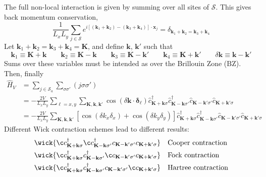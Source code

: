 The full non-local interaction is given by summing over all sites of $\mathcal{S}$. This gives back momentum conservation,
\[
\frac{1}{L_xL_y} \sum_{j \in \mathcal{S}} e^{i \left[ (\mathbf{k}_1 + \mathbf{k}_2) - (\mathbf{k}_3 + \mathbf{k}_4) \right] \cdot \mathbf{x}_j} = \delta_{\mathbf{k}_1 + \mathbf{k}_2 = \mathbf{k}_3 + \mathbf{k}_4}
\]
Let $\mathbf{k}_1 + \mathbf{k}_2 = \mathbf{k}_3 + \mathbf{k}_4 = \mathbf{K}$, and define $\mathbf{k}$, $\mathbf{k}'$ such that
\[
\mathbf{k}_1 \equiv \mathbf{K} + \mathbf{k} 
\qquad
\mathbf{k}_2 \equiv \mathbf{K} - \mathbf{k} 
\qquad
\mathbf{k}_3 \equiv \mathbf{K} - \mathbf{k}' 
\qquad
\mathbf{k}_4 \equiv \mathbf{K} + \mathbf{k}'
\qquad
\delta \mathbf{k} \equiv \mathbf{k}-\mathbf{k}'
\]
Sums over these variables must be intended as over the Brillouin Zone ($\mathrm{BZ}$). Then, finally
\begin{align}
	\hat H_V &= \sum_{j \in \mathcal{S}_a} \sum_{\sigma\sigma'} (j\sigma\sigma') \nonumber \\
	&= - \frac{2V}{L_x L_y} \sum_{\ell = x,y} \sum_{\mathbf{K}, \mathbf{k}, \mathbf{k}'} \cos\left(
		\delta \mathbf{k} \cdot \bm{\delta}_\ell
	\right)	\hat c_{\mathbf{K}+\mathbf{k} \sigma}^\dagger \hat c_{\mathbf{K}-\mathbf{k} \sigma'}^\dagger \hat c_{\mathbf{K}-\mathbf{k}' \sigma'} \hat c_{\mathbf{K}+\mathbf{k}'\sigma} \nonumber \\
	&= - \frac{2V}{L_x L_y} \sum_{\mathbf{K}, \mathbf{k}, \mathbf{k}'} \left[
	\cos \left(
		\delta k_x \delta_x
	\right)	+ \cos \left(
		\delta k_y \delta_y
	\right)	
	\right]	\hat c_{\mathbf{K}+\mathbf{k} \sigma}^\dagger \hat c_{\mathbf{K}-\mathbf{k} \sigma'}^\dagger \hat c_{\mathbf{K}-\mathbf{k}' \sigma'} \hat c_{\mathbf{K}+\mathbf{k}'\sigma} \label{eq:reciprocal-space-non-local-interaction-explicit}
\end{align}
Different Wick contraction schemes lead to different results:
\begin{align}
	&\wick{
		\c
		c_{\mathbf{K}+\mathbf{k} \sigma}^\dagger 
		\c
		c_{\mathbf{K}-\mathbf{k} \sigma'}^\dagger c_{\mathbf{K}-\mathbf{k}' \sigma'} c_{\mathbf{K}+\mathbf{k}'\sigma}
	} &&\text{Cooper contraction} \label{eq:reciprocal-space-cooper-contraction} \\
	&\wick{
		\c
		c_{\mathbf{K}+\mathbf{k} \sigma}^\dagger 
		c_{\mathbf{K}-\mathbf{k} \sigma'}^\dagger
		\c
		c_{\mathbf{K}-\mathbf{k}' \sigma'} c_{\mathbf{K}+\mathbf{k}'\sigma}
	} &&\text{Fock contraction} \label{eq:reciprocal-space-fock-contraction} \\
	&\wick{
		\c
		c_{\mathbf{K}+\mathbf{k} \sigma}^\dagger 
		c_{\mathbf{K}-\mathbf{k} \sigma'}^\dagger c_{\mathbf{K}-\mathbf{k}' \sigma'}
		\c
		c_{\mathbf{K}+\mathbf{k}'\sigma}
	} &&\text{Hartree contraction} \label{eq:reciprocal-space-hartree-contraction}
\end{align}
